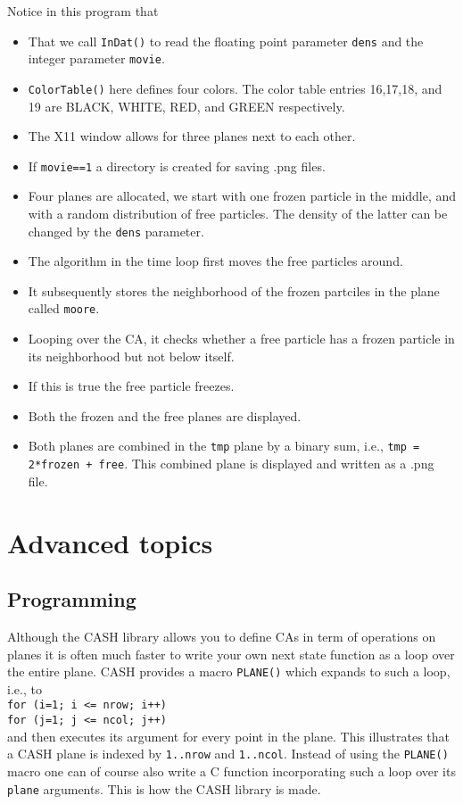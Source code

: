\documentclass[12pt]{article}
\newcommand{\mtt}[1]{\texttt{\\#1\\}}
\begin{document}
Notice in this program that
\begin{itemize}
\item That we call {\tt InDat()} to read the floating point
parameter {\tt dens} and the integer parameter {\tt movie}.
\item {\tt ColorTable()} here defines four colors.
The color table entries 16,17,18, and 19 are BLACK, WHITE, RED,
and GREEN respectively.
\item The X11 window allows for three planes next to each other.
\item If {\tt movie==1} a directory is created for saving .png files.
\item Four planes are allocated, we start with one frozen
particle in the middle, and with a random distribution of free
particles. The density of the latter can be changed by the {\tt dens}
parameter.
\item The algorithm in the time loop first moves the free
particles around. 
\item It subsequently stores the neighborhood of the frozen
partciles in the plane called {\tt moore}.
\item Looping over the CA, it checks whether a free particle
has a frozen particle in its neighborhood but not below itself.
\item If this is true the free particle freezes.
\item Both the frozen and the free planes are displayed.
\item Both planes are combined in the {\tt tmp} plane
by a binary sum, i.e., {\tt tmp = 2*frozen + free}.
This combined plane is displayed and written as a .png file.
\end{itemize}

\section{Advanced topics}
\subsection{Programming}
Although the CASH library allows you to define CAs in term of
operations on planes it is often much faster to write your own
next state function as a loop over the entire plane.
CASH provides a macro {\tt PLANE()} which expands to such a loop, i.e.,
to 
\mtt{for (i=1; i <= nrow; i++)\\for (j=1; j <= ncol; j++)}
and then executes its argument for every point in the plane.
This illustrates that a CASH plane is indexed by {\tt 1..nrow}
and {\tt 1..ncol}.
Instead of using the {\tt PLANE()} macro one can of course
also write a C function incorporating such a loop over its
{\tt plane} arguments. This is how the CASH library is made.
\end{document}
